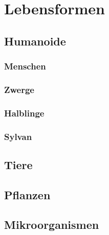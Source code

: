 \section{Lebensformen}
\subsection{Humanoide}
\subsubsection{Menschen}
\subsubsection{Zwerge}
\subsubsection{Halblinge}
\subsubsection{Sylvan}


\subsection{Tiere}
\subsection{Pflanzen}
\subsection{Mikroorganismen}